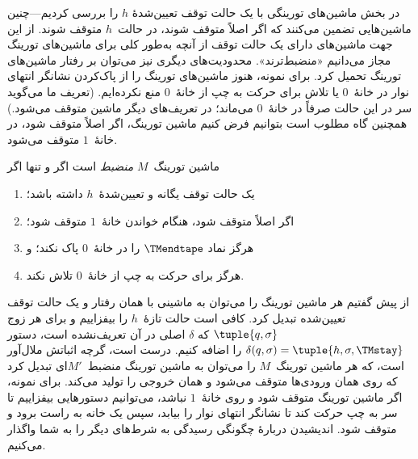 \documentclass[../../../include/open-logic-section]{subfiles}
\begin{document}

\begin{explain}
در بخش  ماشین‌های تورینگی با یک حالت توقف تعیین‌شدهٔ
$h$ را بررسی کردیم---چنین ماشین‌هایی تضمین می‌کنند که اگر اصلاً
متوقف شوند، در حالت~$h$ متوقف شوند. از این جهت ماشین‌های دارای یک
حالت توقف از آنچه به‌طور کلی برای ماشین‌های تورینگ مجاز می‌دانیم
«منضبط‌ترند». محدودیت‌های دیگری نیز می‌توان بر رفتار ماشین‌های تورینگ
تحمیل کرد. برای نمونه، هنوز ماشین‌های تورینگ را از پاک‌کردن نشانگر
انتهای نوار در خانهٔ~$0$ یا تلاش برای حرکت به چپ از خانهٔ~$0$ منع
نکرده‌ایم. (تعریف ما می‌گوید سر در این حالت صرفاً در خانهٔ~$0$
می‌ماند؛ در تعریف‌های دیگر ماشین متوقف می‌شود.) همچنین گاه مطلوب است
بتوانیم فرض کنیم ماشین تورینگ، اگر اصلاً متوقف شود، در خانهٔ~$1$
متوقف می‌شود.
\end{explain}

\begin{defn}
ماشین تورینگ~$M$ \emph{منضبط} است اگر و تنها اگر
\begin{enumerate}
    \item یک حالت توقف یگانه و تعیین‌شدهٔ~$h$ داشته باشد؛
    \item اگر اصلاً متوقف شود، هنگام خواندن خانهٔ~$1$ متوقف شود؛
    \item هرگز نماد $\TMendtape$ را در خانهٔ~$0$ پاک نکند؛ و
    \item هرگز برای حرکت به چپ از خانهٔ~$0$ تلاش نکند.
\end{enumerate}
\end{defn}

\begin{explain}
از پیش گفتیم هر ماشین تورینگ را می‌توان به ماشینی با همان رفتار و یک
حالت توقف تعیین‌شده تبدیل کرد. کافی است حالت تازهٔ~$h$ را بیفزاییم و
برای هر زوج $\tuple{q,\sigma}$ که $\delta$ اصلی در آن تعریف‌نشده است،
دستور $\delta(q,\sigma)=\tuple{h,\sigma,\TMstay}$ را اضافه کنیم. درست است،
گرچه اثباتش ملال‌آور است، که هر ماشین تورینگ~$M$ را می‌توان به ماشین
تورینگ منضبط~$M'$ای تبدیل کرد که روی همان ورودی‌ها متوقف می‌شود و همان
خروجی را تولید می‌کند. برای نمونه، اگر ماشین تورینگ متوقف شود و روی
خانهٔ~$1$ نباشد، می‌توانیم دستورهایی بیفزاییم تا سر به چپ حرکت کند تا
نشانگر انتهای نوار را بیابد، سپس یک خانه به راست برود و متوقف شود.
اندیشیدن دربارهٔ چگونگی رسیدگی به شرط‌های دیگر را به شما واگذار
می‌کنیم.
\end{explain}
\end{document}
